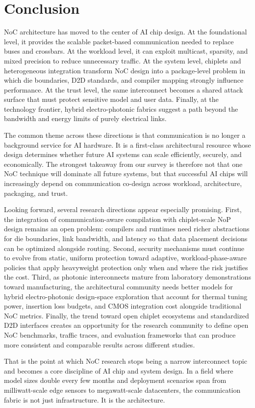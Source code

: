 \section{Conclusion}

NoC architecture has moved to the center of AI chip design. At the foundational level, it provides the scalable packet-based communication needed to replace buses and crossbars. At the workload level, it can exploit multicast, sparsity, and mixed precision to reduce unnecessary traffic. At the system level, chiplets and heterogeneous integration transform NoC design into a package-level problem in which die boundaries, D2D standards, and compiler mapping strongly influence performance. At the trust level, the same interconnect becomes a shared attack surface that must protect sensitive model and user data. Finally, at the technology frontier, hybrid electro-photonic fabrics suggest a path beyond the bandwidth and energy limits of purely electrical links.

The common theme across these directions is that communication is no longer a background service for AI hardware. It is a first-class architectural resource whose design determines whether future AI systems can scale efficiently, securely, and economically. The strongest takeaway from our survey is therefore not that one NoC technique will dominate all future systems, but that successful AI chips will increasingly depend on communication co-design across workload, architecture, packaging, and trust.

Looking forward, several research directions appear especially promising. First, the integration of communication-aware compilation with chiplet-scale NoP design remains an open problem: compilers and runtimes need richer abstractions for die boundaries, link bandwidth, and latency so that data placement decisions can be optimized alongside routing. Second, security mechanisms must continue to evolve from static, uniform protection toward adaptive, workload-phase-aware policies that apply heavyweight protection only when and where the risk justifies the cost. Third, as photonic interconnects mature from laboratory demonstrations toward manufacturing, the architectural community needs better models for hybrid electro-photonic design-space exploration that account for thermal tuning power, insertion loss budgets, and CMOS integration cost alongside traditional NoC metrics. Finally, the trend toward open chiplet ecosystems and standardized D2D interfaces creates an opportunity for the research community to define open NoC benchmarks, traffic traces, and evaluation frameworks that can produce more consistent and comparable results across different studies.

That is the point at which NoC research stops being a narrow interconnect topic and becomes a core discipline of AI chip and system design. In a field where model sizes double every few months and deployment scenarios span from milliwatt-scale edge sensors to megawatt-scale datacenters, the communication fabric is not just infrastructure. It is the architecture.
